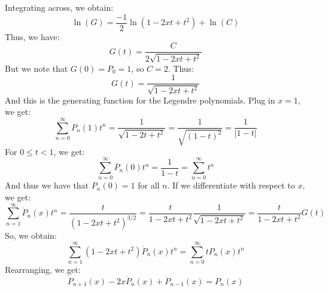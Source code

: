             Integrating across, we obtain:
            \begin{equation}
                \ln(G)=\frac{\minus{1}}{2}\ln(1-2xt+t^{2})+\ln(C)
            \end{equation}
            Thus, we have:
            \begin{equation}
                G(t)=\frac{C}{2\sqrt{1-2xt+t^{2}}}
            \end{equation}
            But we note that $G(0)=P_{0}=1$, so $C=2$. Thus:
            \begin{equation}
                G(t)=\frac{1}{\sqrt{1-2xt+t^{2}}}
            \end{equation}
            And this is the generating function for the
            Legendre polynomials. Plug in $x=1$, we get:
            \begin{equation}
                \sum_{n=0}^{\infty}P_{n}(1)t^{n}=
                \frac{1}{\sqrt{1-2t+t^{2}}}=
                \frac{1}{\sqrt{(1-t)^{2}}}=
                \frac{1}{|1-t|}
            \end{equation}
            For $0\leq{t}<1$, we get:
            \begin{equation}
                \sum_{n=0}^{\infty}P_{n}(0)t^{n}=
                \frac{1}{1-t}=\sum_{n=0}^{\infty}t^{n}
            \end{equation}
            And thus we have that $P_{n}(0)=1$ for all $n$.
            If we differentiate with respect to $x$, we get:
            \begin{equation}
                \sum_{n=1}^{\infty}\dot{P}_{n}(x)t^{n}=
                \frac{t}{(1-2xt+t^{2})^{3/2}}=
                \frac{t}{1-2xt+t^{2}}\frac{1}{\sqrt{1-2xt+t^{2}}}
                =\frac{t}{1-2xt+t^{2}}G(t)
            \end{equation}
            So, we obtain:
            \begin{equation}
                \sum_{n=1}^{\infty}(1-2xt+t^{2})\dot{P}_{n}(x)t^{n}
                =\sum_{n=0}^{\infty}tP_{n}(x)t^{n}
            \end{equation}
            Rearranging, we get:
            \begin{equation}
                \dot{P}_{n+1}(x)-2x\dot{P}_{n}(x)+\dot{P}_{n-1}(x)
                =P_{n}(x)
            \end{equation}
